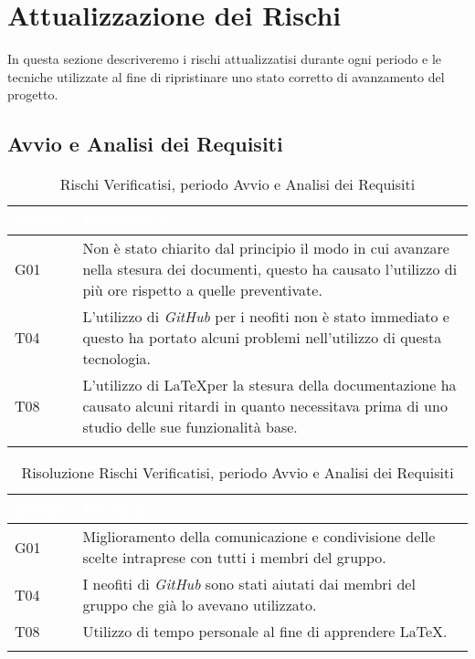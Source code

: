 \section{Attualizzazione dei Rischi}
\label{AR}

In questa sezione descriveremo i rischi attualizzatisi durante ogni periodo e le tecniche utilizzate al fine di ripristinare uno stato corretto di avanzamento del progetto.


\subsection{Avvio e Analisi dei Requisiti}\label{ARAvvioAnalisi}

\begin{longtable}{|C{.15\textwidth}|C{.79\textwidth}|}
\hline
{}\textbf{\textcolor{white}{Rischio}} & \textbf{\textcolor{white}{Descrizione}} \\
\hline \hline
\endfirsthead
G01 & Non è stato chiarito dal principio il modo in cui avanzare nella stesura dei documenti, questo ha causato l'utilizzo di più ore rispetto a quelle preventivate.\\ 
\hline
{}T04 &  L'utilizzo di \textit{GitHub} per i neofiti non è stato immediato e questo ha portato alcuni problemi nell'utilizzo di questa tecnologia. \\
\hline
T08 & L'utilizzo di \LaTeX per la stesura della documentazione ha causato alcuni ritardi in quanto necessitava prima di uno studio delle sue funzionalità base. \\
\hline

\caption{Rischi Verificatisi, periodo Avvio e Analisi dei Requisiti}
\label{tab:rischiVerificatisiAvvioAnalisi}
\end{longtable}

\begin{longtable}{|C{.15\textwidth}|C{.79\textwidth}|}
\hline
{}\textbf{\textcolor{white}{Rischio}} & \textbf{\textcolor{white}{Risoluzione}} \\
\hline \hline
\endfirsthead
G01 & Miglioramento della comunicazione e condivisione delle scelte intraprese con tutti i membri del gruppo.\\ 
\hline
{}T04 & I neofiti di \textit{GitHub} sono stati aiutati dai membri del gruppo che già lo avevano utilizzato. \\
\hline
T08 & Utilizzo di tempo personale al fine di apprendere \LaTeX. \\
\hline

\caption{Risoluzione Rischi Verificatisi, periodo Avvio e Analisi dei Requisiti}
\label{tab:risoluzioneRischiAvvioAnalisi}
\end{longtable}
\pagebreak

